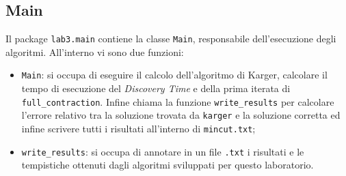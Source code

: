 \subsection{Main}

Il package \texttt{lab3.main} contiene la classe \texttt{Main}, responsabile dell'esecuzione degli algoritmi. All'interno vi sono due funzioni:

\begin{itemize}
	\item \texttt{Main}: si occupa di eseguire il calcolo dell'algoritmo di Karger, calcolare il tempo di esecuzione del \textit{Discovery Time} e della prima iterata di \texttt{full\_contraction}. Infine chiama la funzione \texttt{write\_results} per calcolare l'errore relativo tra la soluzione trovata da \texttt{karger} e la soluzione corretta ed infine scrivere tutti i risultati all'interno di \texttt{mincut.txt};
	\item \texttt{write\_results}: si occupa di annotare in un file \texttt{.txt} i risultati e le tempistiche ottenuti dagli algoritmi sviluppati per questo laboratorio.
\end{itemize}